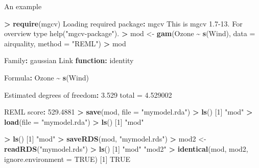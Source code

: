 \documentclass[
  a4paper,
  twoside,
  openright]{book}
\newenvironment{Shaded}{\begin{snugshade}}{\end{snugshade}}
\newcommand{\AttributeTok}[1]{\textcolor[rgb]{0.13,0.29,0.53}{#1}}
\newcommand{\ConstantTok}[1]{\textcolor[rgb]{0.56,0.35,0.01}{#1}}
\newcommand{\ControlFlowTok}[1]{\textcolor[rgb]{0.13,0.29,0.53}{\textbf{#1}}}
\newcommand{\DecValTok}[1]{\textcolor[rgb]{0.00,0.00,0.81}{#1}}
\newcommand{\FloatTok}[1]{\textcolor[rgb]{0.00,0.00,0.81}{#1}}
\newcommand{\FunctionTok}[1]{\textcolor[rgb]{0.13,0.29,0.53}{\textbf{#1}}}
\newcommand{\NormalTok}[1]{#1}
\newcommand{\OtherTok}[1]{\textcolor[rgb]{0.56,0.35,0.01}{#1}}
\newcommand{\SpecialCharTok}[1]{\textcolor[rgb]{0.81,0.36,0.00}{\textbf{#1}}}
\newcommand{\StringTok}[1]{\textcolor[rgb]{0.31,0.60,0.02}{#1}}
\theoremstyle{definition}
\theoremstyle{definition}
\theoremstyle{definition}
\theoremstyle{definition}
\theoremstyle{remark}
\begin{document}
An example

\begin{Shaded}
\begin{Highlighting}[]
\SpecialCharTok{\textgreater{}} \FunctionTok{require}\NormalTok{(mgcv)}
\NormalTok{Loading required package}\SpecialCharTok{:}\NormalTok{ mgcv}
\NormalTok{This is mgcv }\FloatTok{1.7{-}13.}\NormalTok{ For overview type }\StringTok{\textquotesingle{}help("mgcv{-}package")\textquotesingle{}}\NormalTok{.}
\SpecialCharTok{\textgreater{}}\NormalTok{ mod }\OtherTok{\textless{}{-}} \FunctionTok{gam}\NormalTok{(Ozone }\SpecialCharTok{\textasciitilde{}} \FunctionTok{s}\NormalTok{(Wind), }\AttributeTok{data =}\NormalTok{ airquality, }\AttributeTok{method =} \StringTok{"REML"}\NormalTok{)}
\SpecialCharTok{\textgreater{}}\NormalTok{ mod}

\NormalTok{Family}\SpecialCharTok{:}\NormalTok{ gaussian}
\NormalTok{Link }\ControlFlowTok{function}\SpecialCharTok{:}\NormalTok{ identity}

\NormalTok{Formula}\SpecialCharTok{:}
\NormalTok{Ozone }\SpecialCharTok{\textasciitilde{}} \FunctionTok{s}\NormalTok{(Wind)}

\NormalTok{Estimated degrees of freedom}\SpecialCharTok{:}
\FloatTok{3.529}\NormalTok{  total }\OtherTok{=} \FloatTok{4.529002}

\NormalTok{REML score}\SpecialCharTok{:} \FloatTok{529.4881}
\SpecialCharTok{\textgreater{}} \FunctionTok{save}\NormalTok{(mod, }\AttributeTok{file =} \StringTok{"mymodel.rda"}\NormalTok{)}
\SpecialCharTok{\textgreater{}} \FunctionTok{ls}\NormalTok{()}
\NormalTok{[}\DecValTok{1}\NormalTok{] }\StringTok{"mod"}
\SpecialCharTok{\textgreater{}} \FunctionTok{load}\NormalTok{(}\AttributeTok{file =} \StringTok{"mymodel.rda"}\NormalTok{)}
\SpecialCharTok{\textgreater{}} \FunctionTok{ls}\NormalTok{()}
\NormalTok{[}\DecValTok{1}\NormalTok{] }\StringTok{"mod"}


\SpecialCharTok{\textgreater{}} \FunctionTok{ls}\NormalTok{()}
\NormalTok{[}\DecValTok{1}\NormalTok{] }\StringTok{"mod"}
\SpecialCharTok{\textgreater{}} \FunctionTok{saveRDS}\NormalTok{(mod, }\StringTok{"mymodel.rds"}\NormalTok{)}
\SpecialCharTok{\textgreater{}}\NormalTok{ mod2 }\OtherTok{\textless{}{-}} \FunctionTok{readRDS}\NormalTok{(}\StringTok{"mymodel.rds"}\NormalTok{)}
\SpecialCharTok{\textgreater{}} \FunctionTok{ls}\NormalTok{()}
\NormalTok{[}\DecValTok{1}\NormalTok{] }\StringTok{"mod"}  \StringTok{"mod2"}
\SpecialCharTok{\textgreater{}} \FunctionTok{identical}\NormalTok{(mod, mod2, }\AttributeTok{ignore.environment =} \ConstantTok{TRUE}\NormalTok{)}
\NormalTok{[}\DecValTok{1}\NormalTok{] }\ConstantTok{TRUE}
\end{Highlighting}
\end{Shaded}
\end{document}
